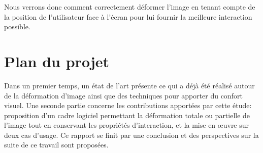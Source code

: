 Nous verrons donc comment correctement déformer l'image en tenant compte de la position de l'utilisateur face à l'écran pour lui fournir la meilleure interaction possible.


%
%
%
%
%
%

\section{Plan du projet}

Dans un premier temps, un état de l'art présente ce qui a déjà été réalisé autour de la déformation d'image ainsi que des techniques pour apporter du confort visuel. Une seconde partie concerne les contributions apportées par cette étude: proposition d'un cadre logiciel permettant la déformation totale ou partielle de l'image tout en conservant les propriétés d'interaction,  et la mise en œuvre sur deux cas d'usage. Ce rapport se finit par une conclusion et des perspectives sur la suite de ce travail sont proposées.